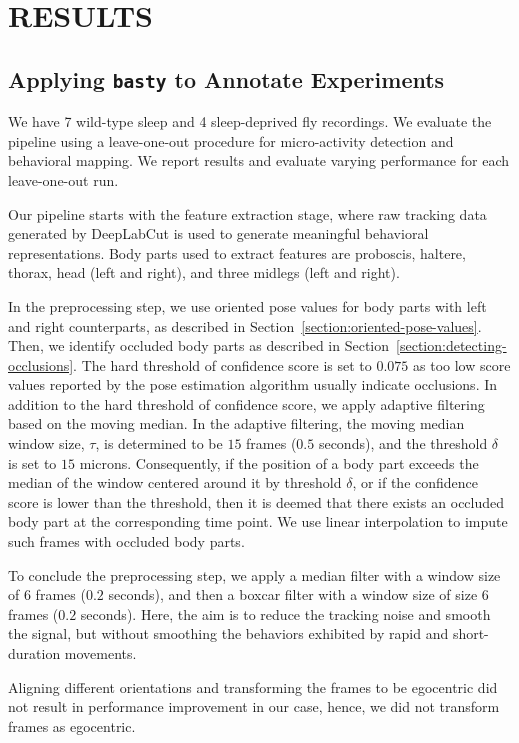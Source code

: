 \setlength{\parindent}{0pt}
\chapter{\bf RESULTS}\label{chapter:results}
\section{Applying \texttt{basty} to Annotate Experiments}\label{section:applying-proposed-pipeline}
We have 7 wild-type sleep and 4 sleep-deprived fly recordings. We evaluate the pipeline  using a leave-one-out procedure for micro-activity detection and behavioral mapping. 
We report results and evaluate varying performance for each leave-one-out run.

Our pipeline starts with the feature extraction stage, where raw tracking data generated by DeepLabCut is used to generate meaningful behavioral representations. Body parts used to extract features are proboscis, haltere, thorax, head (left and right), and three midlegs (left and right).

In the preprocessing step, we use oriented pose values for body parts with left and right counterparts, as described in Section~\ref{section:oriented-pose-values}.
Then, we identify occluded body parts as described in Section~\ref{section:detecting-occlusions}.
The hard threshold of confidence score is set to $0.075$ as too low score values reported by the pose estimation algorithm usually indicate occlusions.
In addition to the hard threshold of confidence score, we apply adaptive filtering based on the moving median.
In the adaptive filtering, the moving median window size, $\tau$, is determined to be $15$ frames ($0.5$ seconds), and the threshold $\delta$ is set to $15$ microns.
Consequently, if the position of a body part exceeds the median of the window centered around it by threshold $\delta$, or if the confidence score is lower than the threshold, then it is deemed that there exists an occluded body part at the corresponding time point.
We use linear interpolation to impute such frames with occluded body parts.

To conclude the preprocessing step, we apply a median filter with a window size of $6$ frames ($0.2$ seconds), and then a boxcar filter with a window size of size $6$ frames ($0.2$ seconds).
Here, the aim is to reduce the tracking noise and smooth the signal, but without smoothing the behaviors exhibited by rapid and short-duration movements.

Aligning different orientations and transforming the frames to be egocentric did not result in performance improvement in our case, hence, we did not transform frames as egocentric.

